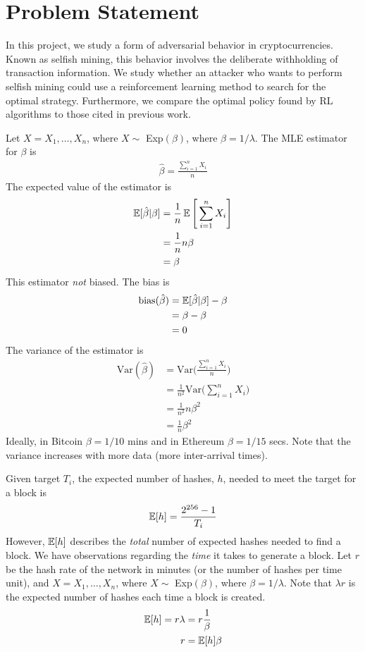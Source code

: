 \section{Problem Statement}
In this project, we study a form of adversarial behavior in cryptocurrencies. Known as selfish mining, this behavior involves the deliberate withholding of transaction information. We study whether an attacker who wants to perform selfish mining could use a reinforcement learning method to search for the optimal strategy. Furthermore, we compare the optimal policy found by RL algorithms to those cited in previous work.

Let $X = X_1, \dots, X_{n}$, where $X \sim$ Exp$(\beta)$, where $\beta = 1/\lambda$. The MLE estimator for $\beta$ is
\begin{align}
\hat{\beta} = \frac{\sum_{i=1}^{n} X_i}{n}
\end{align}
The expected value of the estimator is 
\begin{align}
\operatorname{\mathbb{E}}[\hat{\beta} | \beta] &= \frac{1}{n}\operatorname{\mathbb{E}} \Bigg[\sum_{i=1}^{n} X_i \Bigg] \\
&= \frac{1}{n}n\beta \\
&= \beta
\end{align}
This estimator \textit{not} biased. The bias is
\begin{align}
\text{bias}(\hat{\beta}) &= \operatorname{\mathbb{E}}[\hat{\beta} | \beta] - \beta \\
&= \beta - \beta \\
&= 0
\end{align}
The variance of the estimator is
\begin{align}
\text{Var}(\hat{\beta}) &= \text{Var}\Bigg(\frac{\sum_{i=1}^{n} X_i}{n}\Bigg) \\
&= \frac{1}{n^2} \text{Var}\Bigg(\sum_{i=1}^{n} X_i\Bigg) \\
&= \frac{1}{n^2} n\beta^2\\
&= \frac{1}{n}\beta^2
\end{align}
Ideally, in Bitcoin $\beta = 1/10$ mins and in Ethereum $\beta = 1/15$ secs. Note that the variance increases with more data (more inter-arrival times).

Given target $T_i$, the expected number of hashes, $h$, needed to meet the target for a block is
\begin{align}
\operatorname{\mathbb{E}}[h] = \frac{2^{256}-1}{T_i}
\end{align}
However, $\operatorname{\mathbb{E}}[h]$ describes the \textit{total} number of expected hashes needed to find a block. We have observations regarding the \textit{time} it takes to generate a block. Let $r$ be the hash rate of the network in minutes (or the number of hashes per time unit), and $X = X_1, \dots, X_{n}$, where $X \sim$ Exp$(\beta)$, where $\beta = 1/\lambda$. Note that $\lambda r$ is the expected number of hashes each time a block is created.  %
\begin{align}
\operatorname{\mathbb{E}}[h] = r \lambda &= r \frac{1}{\beta}  \\
r &= \operatorname{\mathbb{E}}[h] \beta
\end{align}

